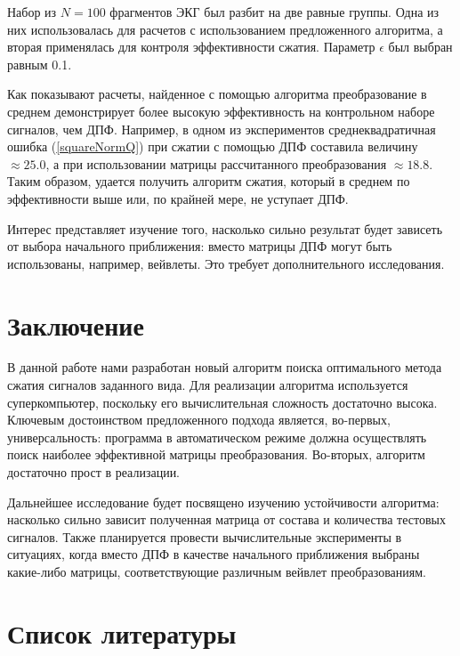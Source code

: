 \documentclass[11pt, oneside, a4paper]{article}
\begin{document}
Набор из $N = 100$ фрагментов ЭКГ был разбит на две равные группы. Одна из них использовалась для расчетов с использованием предложенного алгоритма, а вторая применялась для контроля эффективности сжатия. Параметр $\epsilon$ был выбран равным 0.1.

Как показывают расчеты, найденное с помощью алгоритма преобразование в среднем демонстрирует более высокую эффективность на контрольном наборе сигналов, чем ДПФ. Например, в одном из экспериментов среднеквадратичная ошибка (\ref{squareNormQ}) при сжатии с помощью ДПФ составила величину $\approx25.0$, а  при использовании матрицы рассчитанного преобразования $\approx18.8$. Таким образом, удается получить алгоритм сжатия, который в среднем по эффективности выше или, по крайней мере, не уступает ДПФ.

Интерес представляет изучение того, насколько сильно результат будет зависеть от выбора начального приближения: вместо матрицы ДПФ могут быть использованы, например, вейвлеты. Это требует дополнительного исследования. 


\section{Заключение}

В данной работе нами разработан новый алгоритм поиска оптимального метода сжатия сигналов заданного вида. Для реализации алгоритма используется суперкомпьютер, поскольку его вычислительная сложность достаточно высока. Ключевым достоинством предложенного подхода является, во-первых, универсальность: программа в автоматическом режиме должна осуществлять поиск наиболее эффективной матрицы преобразования. Во-вторых, алгоритм достаточно прост в реализации.

Дальнейшее исследование будет посвящено изучению устойчивости алгоритма: насколько сильно зависит полученная матрица от состава и количества тестовых сигналов. Также планируется провести вычислительные эксперименты в ситуациях, когда вместо ДПФ в качестве начального приближения выбраны какие-либо матрицы, соответствующие различным вейвлет преобразованиям.


\section{Список литературы}
\end{document}
